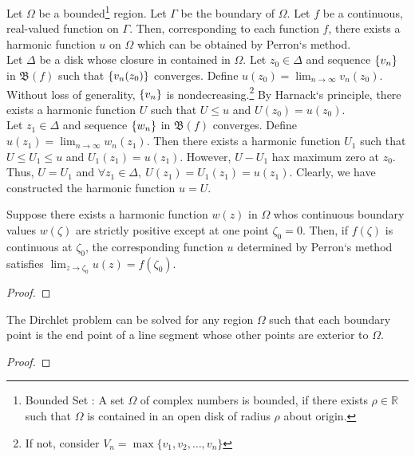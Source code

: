 \begin{remark}
	Let $\Omega$ be a bounded\footnote{Bounded Set : A set $\Omega$ of complex numbers is bounded, if there exists $\rho \in \mathbb{R}$ such that $\Omega$ is contained in an open disk of radius $\rho$ about origin.} region.
	Let $\Gamma$ be the boundary of $\Omega$.
	Let $f$ be a continuous, real-valued function on $\Gamma$.
	Then, corresponding to each function $f$, there exists a harmonic function $u$ on $\Omega$ which can be obtained by Perron`s method.\\

	Let $\Delta$ be a disk whose closure in contained in $\Omega$.
	Let $z_0 \in \Delta$ and sequence $\left\{v_n\right\}$ in $\mathfrak{B}(f)$ such that $\left\{v_n(z_0)\right\}$ converges.
	Define $u(z_0) = \lim_{n \to \infty} v_n(z_0)$.
	Without loss of generality, $\left\{v_n\right\}$ is nondecreasing.\footnote{If not, consider $V_n = \max\{v_1,v_2,\dots,v_n\}$}
	By Harnack`s principle, there exists a harmonic function $U$ such that $U \le u$ and $U(z_0) = u(z_0)$.\\

	Let $z_1 \in \Delta$ and sequence $\left\{w_n\right\}$ in $\mathfrak{B}(f)$ converges.
	Define $u(z_1) = \lim_{n \to \infty} w_n(z_1)$.
	Then there exists a harmonic function $U_1$ such that $U \le U_1 \le u$ and $U_1(z_1) = u(z_1)$.
	However, $U - U_1$ hax maximum zero at $z_0$.
	Thus, $U = U_1$ and $\forall z_1 \in \Delta,\ U(z_1) = U_1(z_1) = u(z_1)$.
	Clearly, we have constructed the harmonic function $u = U$.
\end{remark}

\begin{lemma}
	Suppose there exists a harmonic function $w(z)$ in $\Omega$ whos continuous boundary values $w(\zeta)$ are strictly positive except at one point $\zeta_0 = 0$. Then, if $f(\zeta)$ is continuous at $\zeta_0$, the corresponding function $u$ determined by Perron`s method satisfies $\displaystyle \lim_{z \to \zeta_0} u(z) = f(\zeta_0)$.
\end{lemma}
\begin{proof}
\end{proof}

\begin{theorem}
	The Dirchlet problem can be solved for any region $\Omega$ such that each boundary point is the end point of a line segment whose other points are exterior to $\Omega$.
\end{theorem}
\begin{proof}
\end{proof}

